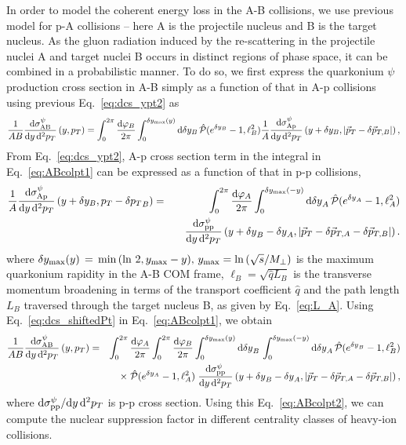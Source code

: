 \documentclass[11pt,onecolumn]{article}
\newcommand{\dd}{{\rm d}}
\newcommand{\beq}{\begin{equation}}
\newcommand{\eeq}{\end{equation}}
\newcommand{\bqa}{\begin{eqnarray}}
\newcommand{\eqa}{\end{eqnarray}}
\begin{document}
In order to model the coherent energy loss in the A-B collisions, we use previous model for p-A collisions -- here A is the projectile nucleus and B is the target nucleus. As the gluon radiation induced by the re-scattering in the projectile nuclei A and target nuclei B occurs in distinct regions of phase space, it can be combined in a probabilistic manner. To do so, we first express the quarkonium $\psi$ production cross section in A-B simply as a function of that in A-p collisions using previous Eq.~\eqref{eq:dcs_ypt2} as
%
\beq
\frac{1}{A B}\frac{\dd\sigma_{\mathrm{AB}}^{\psi}}{\dd y \, \dd^2 p_T}\left(y,  p_T \right)  = \int_{0}^{2\pi} \frac{\dd \varphi_B}{2\pi} \int_0^{\delta y_{\rm max}(y)} \dd \delta y_B \,\hat{\cal P}(e^{\delta y_B} - 1, \ell_B^2) \frac{1}{A} \frac{\dd\sigma_{\mathrm{Ap}}^{\psi}}{\dd y \, \dd^2 p_T} \left( y + \delta y_B, |\vec{p}_T - \delta \vec{p}_{T,B}| \right) ,
\label{eq:ABcolpt1}
\eeq
%
From Eq.~\eqref{eq:dcs_ypt2}, A-p cross section term in the integral in Eq.~\eqref{eq:ABcolpt1} can be expressed as a function of that in p-p collisions,
%
\bqa
\frac{1}{A}\frac{\dd\sigma_{\mathrm{Ap}}^{\psi}}{\dd y \, \dd^2 p_T}\left(y + \delta y_B, p_T - {\delta p_T}_B \right) = && \int_{0}^{2\pi} \frac{\dd \varphi_A}{2\pi} \int_0^{\delta y_{\rm max}(- y)} \dd {\delta y}_A \,\hat{\cal P}(e^{{\delta y}_A} - 1, \ell_A^2) \nonumber \\
&& \quad \frac{\dd\sigma_{\mathrm{pp}}^{\psi}}{\dd y \, \dd^2 p_T} \left( y + {\delta y}_B  - {\delta y}_A , |\vec{p}_T - \delta \vec{p}_{T,A} - \delta \vec{p}_{T,B}|\right) .
\label{eq:dcs_shiftedPt}
\eqa
%
where $\delta y_{\rm max}(y) \, = \, \text{min} \, (\ln \, 2,y_{\rm max}-y), \, y_{\rm max} = \ln \, (\sqrt{s}/M_\perp) $ is the maximum quarkonium rapidity in the A-B COM frame, $\ell_B = \sqrt{\hat{q} L_B}$ is the transverse momentum broadening in terms of the transport coefficient $\hat{q}$ and the path length $L_B$ traversed through the target nucleus B, as given by Eq.~\eqref{eq:L_A}. Using Eq.~\eqref{eq:dcs_shiftedPt} in Eq.~\eqref{eq:ABcolpt1}, we obtain
%
\bqa
\frac{1}{A B}\frac{\dd\sigma_{\mathrm{AB}}^{\psi}}{\dd y \, \dd^2 p_T}\left(y,  p_T \right) &=& \int_{0}^{2\pi} \frac{\dd \varphi_A}{2\pi} \int_{0}^{2\pi} \frac{\dd \varphi_B}{2\pi} \int_0^{\delta y_{\rm max}(y)} \dd {\delta y}_B \, \int_0^{\delta y_{\rm max}(- y)} \dd {\delta y}_A \, \hat{\cal P}(e^{{\delta y}_B} - 1, \ell_B^2) \nonumber \\ 
&& \times \; \hat{\cal P}(e^{\delta y_A} - 1, \ell_A^2) \; \frac{\dd\sigma_{\mathrm{pp}}^{\psi}}{\dd y \, \dd^2 p_T} \left( y + {\delta y}_B  - {\delta y}_A , |\vec{p}_T - \delta \vec{p}_{T,A} - \delta \vec{p}_{T,B}|\right) , \nonumber \\
\label{eq:ABcolpt2}
\eqa
%
where $\dd\sigma_{\mathrm{pp}}^{\psi}/\dd y \, \dd^2 p_T$ is p-p cross section. Using this Eq.~\eqref{eq:ABcolpt2}, we can compute the nuclear suppression factor in different centrality classes of heavy-ion collisions.
\end{document}
